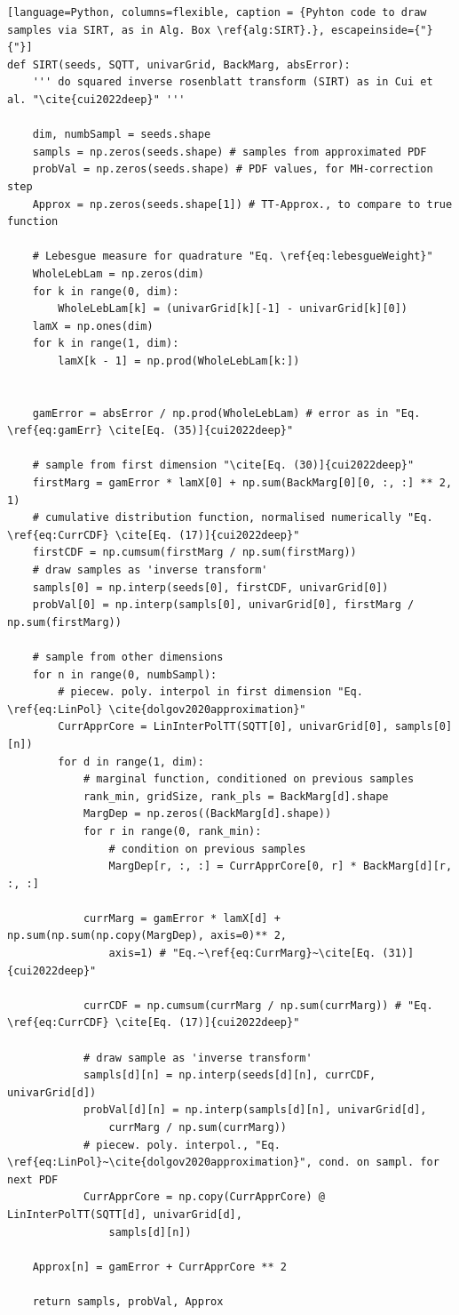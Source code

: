 \clearpage
\begin{lstlisting}[language=Python,	columns=flexible, caption = {Pyhton code to draw samples via SIRT, as in Alg. Box \ref{alg:SIRT}.}, escapeinside={"}{"}]
def SIRT(seeds, SQTT, univarGrid, BackMarg, absError):
	''' do squared inverse rosenblatt transform (SIRT) as in Cui et al. "\cite{cui2022deep}" '''
	
	dim, numbSampl = seeds.shape
	sampls = np.zeros(seeds.shape) # samples from approximated PDF
	probVal = np.zeros(seeds.shape) # PDF values, for MH-correction step
	Approx = np.zeros(seeds.shape[1]) # TT-Approx., to compare to true function
	
	# Lebesgue measure for quadrature "Eq. \ref{eq:lebesgueWeight}"
	WholeLebLam = np.zeros(dim)
	for k in range(0, dim):
		WholeLebLam[k] = (univarGrid[k][-1] - univarGrid[k][0])
	lamX = np.ones(dim)
	for k in range(1, dim):
		lamX[k - 1] = np.prod(WholeLebLam[k:])
	
	
	gamError = absError / np.prod(WholeLebLam) # error as in "Eq. \ref{eq:gamErr} \cite[Eq. (35)]{cui2022deep}"
	
	# sample from first dimension "\cite[Eq. (30)]{cui2022deep}"
	firstMarg = gamError * lamX[0] + np.sum(BackMarg[0][0, :, :] ** 2, 1)
	# cumulative distribution function, normalised numerically "Eq. \ref{eq:CurrCDF} \cite[Eq. (17)]{cui2022deep}"
	firstCDF = np.cumsum(firstMarg / np.sum(firstMarg))
	# draw samples as 'inverse transform'
	sampls[0] = np.interp(seeds[0], firstCDF, univarGrid[0])
	probVal[0] = np.interp(sampls[0], univarGrid[0], firstMarg / np.sum(firstMarg))
	
	# sample from other dimensions
	for n in range(0, numbSampl):
		# piecew. poly. interpol in first dimension "Eq. \ref{eq:LinPol} \cite{dolgov2020approximation}"
		CurrApprCore = LinInterPolTT(SQTT[0], univarGrid[0], sampls[0][n])
		for d in range(1, dim):
			# marginal function, conditioned on previous samples
			rank_min, gridSize, rank_pls = BackMarg[d].shape
			MargDep = np.zeros((BackMarg[d].shape))
			for r in range(0, rank_min):
				# condition on previous samples
				MargDep[r, :, :] = CurrApprCore[0, r] * BackMarg[d][r, :, :]
			
			currMarg = gamError * lamX[d] + np.sum(np.sum(np.copy(MargDep), axis=0)** 2,
				axis=1) # "Eq.~\ref{eq:CurrMarg}~\cite[Eq. (31)]{cui2022deep}"
			
			currCDF = np.cumsum(currMarg / np.sum(currMarg)) # "Eq. \ref{eq:CurrCDF} \cite[Eq. (17)]{cui2022deep}"
			
			# draw sample as 'inverse transform'
			sampls[d][n] = np.interp(seeds[d][n], currCDF, univarGrid[d])
			probVal[d][n] = np.interp(sampls[d][n], univarGrid[d],  
				currMarg / np.sum(currMarg))
			# piecew. poly. interpol., "Eq. \ref{eq:LinPol}~\cite{dolgov2020approximation}", cond. on sampl. for next PDF
			CurrApprCore = np.copy(CurrApprCore) @ LinInterPolTT(SQTT[d], univarGrid[d], 
				sampls[d][n]) 
	
	Approx[n] = gamError + CurrApprCore ** 2
	
	return sampls, probVal, Approx
\end{lstlisting}
\clearpage



